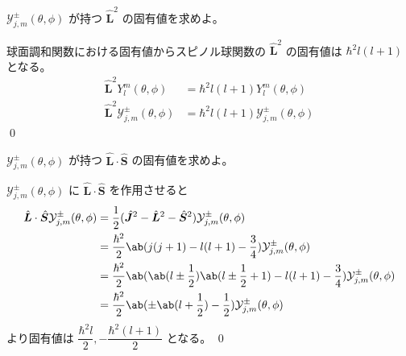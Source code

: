 \documentclass[uplatex,dvipdfmx,a4paper,11pt]{jlreq}
\makeatletter
\theoremstyle{definition}
\renewenvironment{proof}[1][\proofname]{\par
  \normalfont
  \topsep6\p@\@plus6\p@ \trivlist
  \item[\hskip\labelsep{\bfseries #1}\@addpunct{\bfseries}]\ignorespaces\quad\par
}{%
  \qed\endtrivlist\@endpefalse
}
\renewcommand\proofname{証明}
\numberwithin{equation}{section}
\makeatother
\begin{document}
\begin{problem}
$\mathcal{Y}_{j, m}^\pm(\theta, \phi)$ が持つ $\hat{\bm{L}}^2$ の固有値を求めよ。
\end{problem}
\begin{proof}
  球面調和関数における固有値からスピノル球関数の $\hat{\bm{L}}^2$ の固有値は $\hbar^2l(l+1)$ となる。
  \begin{align}
    \hat{\bm{L}}^2Y_l^m(\theta, \phi)                  & = \hbar^2l(l+1) Y_l^m(\theta, \phi)                  \\
    \hat{\bm{L}}^2\mathcal{Y}_{j, m}^\pm(\theta, \phi) & = \hbar^2l(l+1) \mathcal{Y}_{j, m}^\pm(\theta, \phi)
  \end{align}
\end{proof}

\begin{problem}
$\mathcal{Y}_{j, m}^\pm(\theta, \phi)$ が持つ $\hat{\bm{L}}\cdot\hat{\bm{S}}$ の固有値を求めよ。
\end{problem}
\begin{proof}
  $\mathcal{Y}_{j, m}^\pm(\theta, \phi)$ に $\hat{\bm{L}}\cdot\hat{\bm{S}}$ を作用させると
  \begin{align}
    \hat{\bm{L}}\cdot\hat{\bm{S}}\mathcal{Y}_{j, m}^\pm(\theta, \phi) & = \frac{1}{2}(\hat{\bm{J}}^2 - \hat{\bm{L}}^2 - \hat{\bm{S}}^2)\mathcal{Y}_{j, m}^\pm(\theta, \phi)                             \\
                                                                      & = \frac{\hbar^2}{2}\ab(j(j+1) - l(l+1) - \frac{3}{4})\mathcal{Y}_{j, m}^\pm(\theta, \phi)                                       \\
                                                                      & = \frac{\hbar^2}{2}\ab(\ab(l\pm \frac{1}{2})\ab(l\pm \frac{1}{2}+1) - l(l+1) - \frac{3}{4})\mathcal{Y}_{j, m}^\pm(\theta, \phi) \\
                                                                      & = \frac{\hbar^2}{2}\ab(\pm\ab(l + \frac{1}{2}) - \frac{1}{2})\mathcal{Y}_{j, m}^\pm(\theta, \phi)                               \\
  \end{align}
  より固有値は $\dfrac{\hbar^2l}{2}, -\dfrac{\hbar^2(l+1)}{2}$ となる。
\end{proof}
\end{document}
